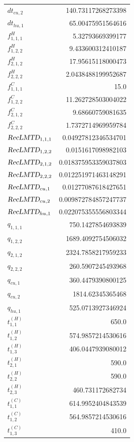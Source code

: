 \documentclass{article}%
\begin{document}
\begin{multicols*}{3}
\begin{supertabular}{lr}
	$dt_{cu,2}$ & 140.73117268273398 \\%
	$dt_{hu,1}$ & 65.00475951564616 \\%
	$f_{1,1,1}^{H}$ & 5.32793669399177 \\%
	$f_{1,2,2}^{H}$ & 9.433600312410187 \\%
	$f_{2,1,2}^{H}$ & 17.95615118000473 \\%
	$f_{2,2,2}^{H}$ & 2.0438488199952687 \\%
	$f_{1,1,1}^{C}$ & 15.0 \\%
	$f_{1,2,2}^{C}$ & 11.262728503004022 \\%
	$f_{2,1,2}^{C}$ & 9.68660759081635 \\%
	$f_{2,2,2}^{C}$ & 1.7372714969959784 \\%
	$\textsl{RecLMTD}_{1,1,1}$ & 0.04927812346534701 \\%
	$\textsl{RecLMTD}_{1,2,2}$ & 0.0151617098982103 \\%
	$\textsl{RecLMTD}_{2,1,2}$ & 0.018375953359037803 \\%
	$\textsl{RecLMTD}_{2,2,2}$ & 0.012251971463148291 \\%
	$\textsl{RecLMTD}_{cu,1}$ & 0.01277087618427651 \\%
	$\textsl{RecLMTD}_{cu,2}$ & 0.009872784857247737 \\%
	$\textsl{RecLMTD}_{hu,1}$ & 0.022075355556803344 \\%
	$q_{1,1,1}$ & 750.1427854693839 \\%
	$q_{1,2,2}$ & 1689.4092754506032 \\%
	$q_{2,1,2}$ & 2324.7858217959233 \\%
	$q_{2,2,2}$ & 260.5907245493968 \\%
	$q_{cu,1}$ & 360.4479390800125 \\%
	$q_{cu,2}$ & 1814.62345365468 \\%
	$q_{hu,1}$ & 525.0713927346924 \\%
	$t_{1,1}^{(H)}$ & 650.0 \\%
	$t_{1,2}^{(H)}$ & 574.9857214530616 \\%
	$t_{1,3}^{(H)}$ & 406.0447939080012 \\%
	$t_{2,1}^{(H)}$ & 590.0 \\%
	$t_{2,2}^{(H)}$ & 590.0 \\%
	$t_{2,3}^{(H)}$ & 460.731172682734 \\%
	$t_{1,1}^{(C)}$ & 614.9952404843539 \\%
	$t_{1,2}^{(C)}$ & 564.9857214530616 \\%
	$t_{1,3}^{(C)}$ & 410.0 \\%

\end{supertabular}
\end{multicols*}
\end{document}
